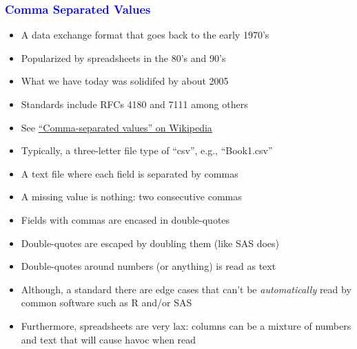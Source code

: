 \documentclass[11pt,pdftex,dvipsnames,usenames]{beamer}
\begin{document}
\begin{frame}[fragile]\frametitle{\bf\textcolor{blue}{Comma Separated Values}}

\begin{itemize}
\item A data exchange format that goes back to the early 1970's
\item Popularized by spreadsheets in the 80's and 90's
\item What we have today was solidifed by about 2005 
\item Standards include RFCs 4180 and 7111 among others
\item See \href{https://en.wikipedia.org/wiki/Comma-separated_values}
{``Comma-separated values'' on Wikipedia} 
\item Typically, a three-letter file type of ``csv'',
e.g., ``Book1.csv''
\item A text file where each field is separated by commas
\item A missing value is nothing: two consecutive commas
\item Fields with commas are encased in double-quotes
\item Double-quotes are escaped by doubling them (like SAS does)
\item Double-quotes around numbers (or anything) is read as text 
\item Although, a standard there are edge cases that can't be
  {\it automatically} read by common software such as R and/or SAS
\item Furthermore, spreadsheets are very lax: columns can be a mixture of numbers and text that will cause havoc when read
\end{itemize}

\end{frame}
\end{document}
